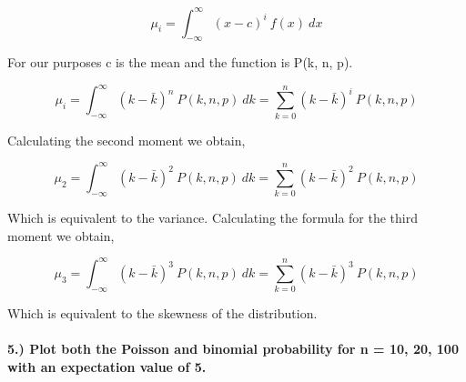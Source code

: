 \documentclass[11pt]{article}
\begin{document}
\[ \mu_i = \int_{- \infty}^{\infty} (x-c)^i \ f(x) \ dx \]

For our purposes c is the mean and the function is P(k, n, p).

\[ \mu_i = \int_{- \infty}^{\infty} (k - \bar{k})^n \ P(k, n, p) \ dk  = \sum_{k=0}^{n} (k - \bar{k})^i \ P(k, n, p)\]

Calculating the second moment we obtain,

\[ \mu_2 = \int_{- \infty}^{\infty} (k - \bar{k})^2 \ P(k, n, p) \ dk  = \sum_{k=0}^{n} (k - \bar{k})^2 \ P(k, n, p) \]

Which is equivalent to the variance. Calculating the formula for the
third moment we obtain,

\[ \mu_3 = \int_{- \infty}^{\infty} (k - \bar{k})^3 \ P(k, n, p) \ dk  = \sum_{k=0}^{n} (k - \bar{k})^3 \ P(k, n, p) \]

Which is equivalent to the skewness of the distribution.

    \paragraph{5.) Plot both the Poisson and binomial probability for n =
10, 20, 100 with an expectation value of
5.}\label{plot-both-the-poisson-and-binomial-probability-for-n-10-20-100-with-an-expectation-value-of-5.}
\end{document}
